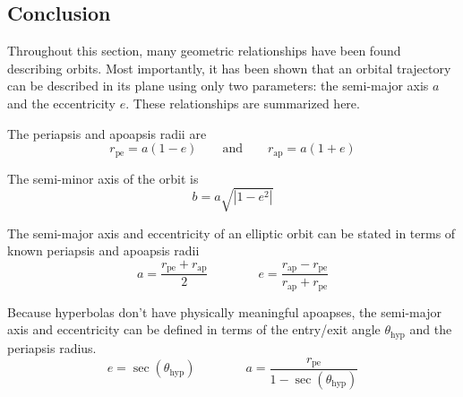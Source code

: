 \documentclass[../main.tex]{subfiles}
\begin{document}
\bigskip\bigskip
\subsection{Conclusion}

Throughout this section, many geometric relationships have been found describing orbits. Most importantly, it has been shown that an orbital trajectory can be described in its plane using only two parameters: the semi-major axis $a$ and the eccentricity $e$. These relationships are summarized here.

\bigskip
The periapsis and apoapsis radii are
$$r_\text{pe}=a(1-e)\qquad\text{and}\qquad r_\text{ap}=a(1+e)$$

\bigskip
The semi-minor axis of the orbit is
$$b=a\sqrt{|1-e^2|}$$

\bigskip
The semi-major axis and eccentricity of an elliptic orbit can be stated in terms of known periapsis and apoapsis radii
$$a=\frac{r_\text{pe}+r_\text{ap}}{2}\qquad\qquad e=\frac{r_\text{ap}-r_\text{pe}}{r_\text{ap}+r_\text{pe}}$$

Because hyperbolas don't have physically meaningful apoapses, the semi-major axis and eccentricity can be defined in terms of the entry/exit angle $\theta_\text{hyp}$ and the periapsis radius.
$$e=\sec(\theta_\text{hyp})\qquad\qquad a=\frac{{r_\text{pe}}}{1-\sec(\theta_\text{hyp})}$$
\end{document}
